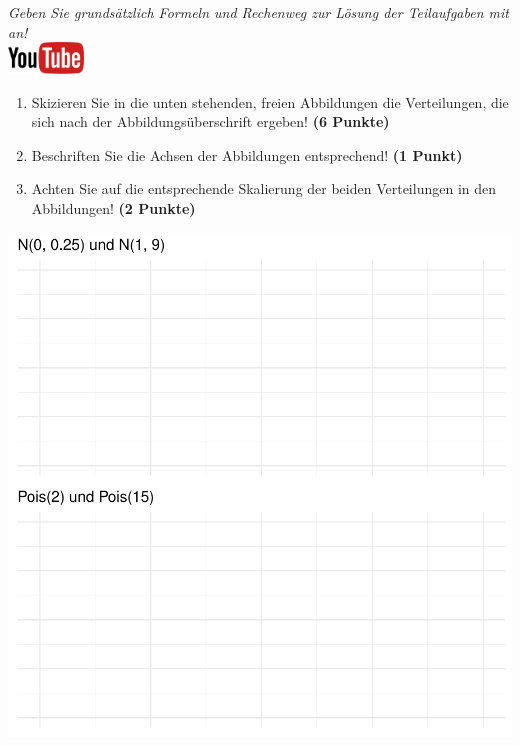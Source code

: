 \documentclass[a4paper, 10pt]{scrartcl}\usepackage[]{graphicx}\usepackage[]{xcolor}
\makeatletter
\def\maxwidth{ %
  \ifdim\Gin@nat@width>\linewidth
    \linewidth
  \else
    \Gin@nat@width
  \fi
}
\makeatother
\begin{document}
\textit{Geben Sie grunds{\"a}tzlich Formeln und Rechenweg zur L{\"o}sung der
  Teilaufgaben mit an!} \\[1Ex]

\hfill\href{https://youtu.be/MiD42k4l5Ag}{\includegraphics[width =
  2cm]{img/youtube}}\\[1Ex]



\begin{enumerate}
\item Skizieren Sie in die unten stehenden, freien Abbildungen die
  Verteilungen, die sich nach der Abbildungs{\"u}berschrift ergeben! \textbf{(6
    Punkte)}
\item Beschriften Sie die Achsen der Abbildungen entsprechend! \textbf{(1
    Punkt)}
\item Achten Sie auf die entsprechende Skalierung der beiden Verteilungen
  in den Abbildungen! \textbf{(2 Punkte)}
\end{enumerate}



{\centering \includegraphics[width=\maxwidth]{img/histogram-01-1} 

}
\end{document}
